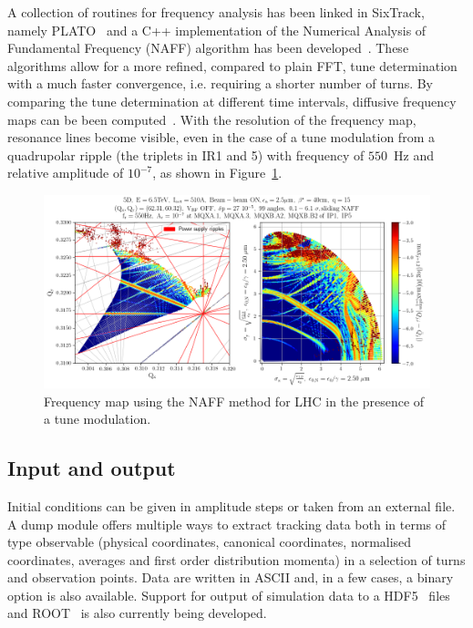 \documentclass{ws-ijmpa}
\begin{document}
A collection of routines for frequency analysis has been linked in SixTrack, namely PLATO~\cite{plato} and a C++ implementation of the Numerical Analysis of Fundamental Frequency (NAFF) algorithm has been developed~\cite{naff}. These algorithms allow for a more refined, compared to plain FFT, tune determination with a much faster convergence, i.e. requiring a shorter number of turns. By comparing the tune determination at different time intervals,  diffusive frequency maps can be been computed~\cite{laskar}. With the resolution of the frequency map, resonance lines become visible, even in the case of a tune modulation from a quadrupolar ripple (the triplets in IR1 and 5) with frequency of $550$~Hz and relative amplitude of $10^{-7}$, as shown in Figure~\ref{fig:fma}.

\begin{figure}[!tbh]
\centering
 \includegraphics[width=\textwidth]{FMA.png}
 \caption{Frequency map using the NAFF method for LHC in the presence of a tune modulation.}
 \label{fig:fma}
\end{figure}

\subsection{Input and output}

Initial conditions can be given in amplitude steps or taken from an external file. A dump module offers multiple ways to extract tracking data both in terms of type observable (physical coordinates, canonical coordinates, normalised coordinates, averages and first order distribution momenta) in a selection of turns and observation points. Data are written in ASCII and, in a few cases, a binary option is also available. Support for output of simulation data to a HDF5~\cite{hdf5} files and ROOT~\cite{root} is also currently being developed.
\end{document}
